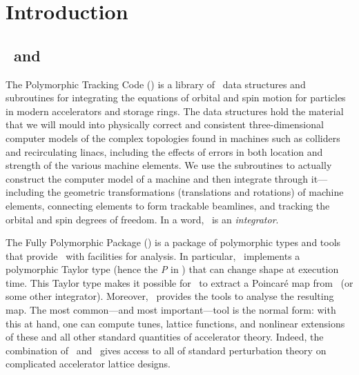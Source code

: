 
\cleardoublepage
\chapter{Introduction}
\label{cha:intro}


\section{\PTC\ and \FPP}

%
The Polymorphic Tracking Code (\PTC) is a library of \Fninety\ data
structures and subroutines for integrating the equations of orbital
and spin motion for particles in modern accelerators and storage rings.
The data structures hold the material that we will mould into
physically correct and consistent three-dimensional computer models
of the complex topologies found in machines such as colliders and
recirculating linacs, including the effects of errors in both
location and strength of the various machine elements.
We use the subroutines to actually construct the computer model
of a machine and then integrate through it---including the
geometric transformations (translations and rotations) of machine
elements, connecting elements to form trackable beamlines, and
tracking the orbital and spin degrees of freedom.
In a word, \PTC\ is an \emph{integrator}.

%
The Fully Polymorphic Package (\FPP)
is a package of polymorphic types and tools that provide \PTC\ with
facilities for analysis. In particular, \FPP\ implements a polymorphic
Taylor type (hence the \emph{P} in \PTC) that can change shape at
execution time. This Taylor type makes it possible for \FPP\ to extract
a Poincar\'e map from \PTC\ (or some other integrator). Moreover,
\FPP\ provides the tools to analyse the resulting map. The most
common---and most important---tool is the normal form: with
this at hand, one can compute tunes, lattice functions,
and nonlinear extensions of these and all other standard quantities of
accelerator theory. Indeed, the combination of \PTC\ and \FPP\ gives
access to all of standard perturbation theory on complicated
accelerator lattice designs.

